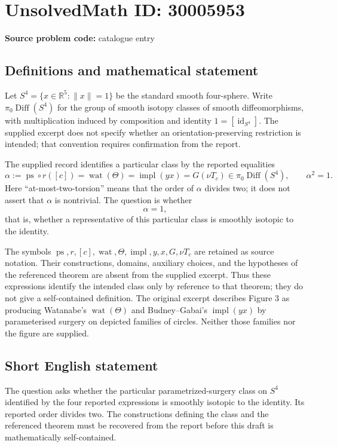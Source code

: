 \documentclass[11pt]{article}
\newcommand{\R}{\mathbb{R}}
\begin{document}
\section*{UnsolvedMath ID: 30005953}
\textbf{Source problem code:} catalogue entry
\subsection{Definitions and mathematical statement}
Let \(S^4=\{x\in\R^5:\|x\|=1\}\) be the standard smooth four-sphere. Write \(\pi_0\operatorname{Diff}(S^4)\) for the group of smooth isotopy classes of smooth diffeomorphisms, with multiplication induced by composition and identity \(1=[\operatorname{id}_{S^4}]\). The supplied excerpt does not specify whether an orientation-preserving restriction is intended; that convention requires confirmation from the report.

The supplied record identifies a particular class by the reported equalities
\[
\alpha:=\operatorname{ps}\circ r([c])
=\operatorname{wat}(\Theta)
=\operatorname{impl}(yx)
=G(\nu T_c)
\in\pi_0\operatorname{Diff}(S^4),
\qquad \alpha^2=1.
\]
Here ``at-most-two-torsion'' means that the order of \(\alpha\) divides two; it does not assert that \(\alpha\) is nontrivial. The question is whether
\[
\alpha=1,
\]
that is, whether a representative of this particular class is smoothly isotopic to the identity.

The symbols \(\operatorname{ps},r,[c],\operatorname{wat},\Theta,\operatorname{impl},y,x,G,\nu T_c\) are retained as source notation. Their constructions, domains, auxiliary choices, and the hypotheses of the referenced theorem are absent from the supplied excerpt. Thus these expressions identify the intended class only by reference to that theorem; they do not give a self-contained definition. The original excerpt describes Figure 3 as producing Watanabe's \(\operatorname{wat}(\Theta)\) and Budney--Gabai's \(\operatorname{impl}(yx)\) by parameterised surgery on depicted families of circles. Neither those families nor the figure are supplied.
\subsection{Short English statement}
The question asks whether the particular parametrized-surgery class on \(S^4\) identified by the four reported expressions is smoothly isotopic to the identity. Its reported order divides two. The constructions defining the class and the referenced theorem must be recovered from the report before this draft is mathematically self-contained.
\end{document}
